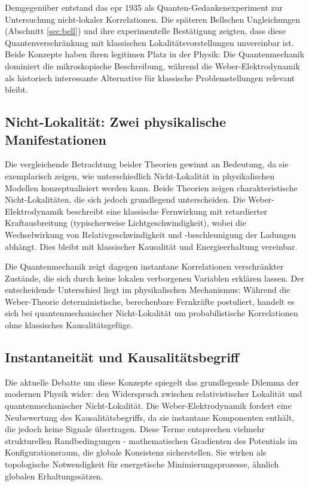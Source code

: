 Demgegenüber entstand das \gls{epr} 1935 als Quanten-Gedankenexperiment zur Untersuchung nicht-lokaler Korrelationen. Die späteren Bellschen Ungleichungen (Abschnitt \ref{sec:bell}) und
ihre experimentelle Bestätigung zeigten, dass diese Quantenverschränkung mit klassischen Lokalitätsvorstellungen unvereinbar ist. Beide Konzepte haben ihren legitimen Platz in der
Physik: Die Quantenmechanik dominiert die mikroskopische Beschreibung, während die Weber-Elektrodynamik als historisch interessante Alternative für klassische Problemstellungen relevant bleibt.

\subsection{Nicht-Lokalität: Zwei physikalische Manifestationen}
Die vergleichende Betrachtung beider Theorien gewinnt an Bedeutung, da sie exemplarisch zeigen, wie unterschiedlich Nicht-Lokalität in physikalischen Modellen konzeptualisiert
werden kann. Beide Theorien zeigen charakteristische Nicht-Lokalitäten, die sich jedoch grundlegend unterscheiden. Die Weber-Elektrodynamik beschreibt eine klassische Fernwirkung
mit retardierter Kraftausbreitung (typischerweise Lichtgeschwindigkeit), wobei die Wechselwirkung von Relativgeschwindigkeit und -beschleunigung der Ladungen abhängt. Dies bleibt mit
klassischer Kausalität und Energieerhaltung vereinbar.

Die Quantenmechanik zeigt dagegen instantane Korrelationen verschränkter Zustände, die sich durch keine lokalen verborgenen Variablen erklären lassen. Der entscheidende Unterschied
liegt im physikalischen Mechanismus: Während die Weber-Theorie deterministische, berechenbare Fernkräfte postuliert, handelt es sich bei quantenmechanischer Nicht-Lokalität um
probabilistische Korrelationen ohne klassisches Kausalitätsgefüge.

\subsection{Instantaneität und Kausalitätsbegriff}
Die aktuelle Debatte um diese Konzepte spiegelt das grundlegende Dilemma der modernen Physik wider: den Widerspruch zwischen relativistischer Lokalität und quantenmechanischer
Nicht-Lokalität. Die Weber-Elektrodynamik fordert eine Neubewertung des Kausalitätsbegriffs, da sie instantane Komponenten enthält, die jedoch keine Signale übertragen. Diese Terme
entsprechen vielmehr strukturellen Randbedingungen - mathematischen Gradienten des Potentials im Konfigurationsraum, die globale Konsistenz sicherstellen. Sie wirken als topologische
Notwendigkeit für energetische Minimierungsprozesse, ähnlich globalen Erhaltungssätzen.

